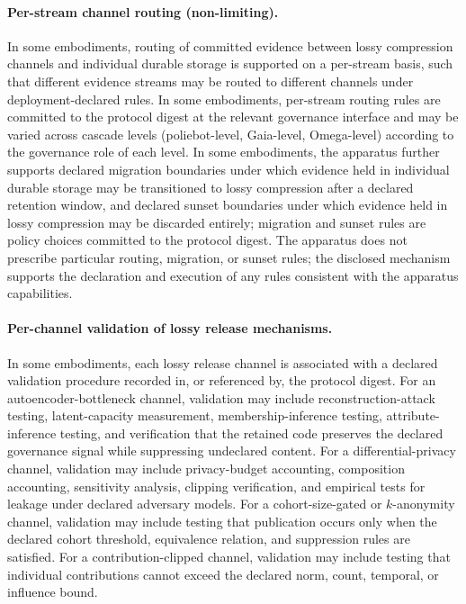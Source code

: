 \documentclass[a4paper,12pt]{article}
\begin{document}
\paragraph{Per-stream channel routing (non-limiting).}
In some embodiments, routing of committed evidence between lossy
compression channels and individual durable storage is supported on
a per-stream basis, such that different evidence streams may be
routed to different channels under deployment-declared rules. In
some embodiments, per-stream routing rules are committed to the
protocol digest at the relevant governance interface and may be
varied across cascade levels (poliebot-level, Gaia-level, Omega-level)
according to the governance role of each level. In some embodiments,
the apparatus further supports declared migration boundaries under
which evidence held in individual durable storage may be transitioned
to lossy compression after a declared retention window, and declared
sunset boundaries under which evidence held in lossy compression
may be discarded entirely; migration and sunset rules are policy
choices committed to the protocol digest. The apparatus does not
prescribe particular routing, migration, or sunset rules; the
disclosed mechanism supports the declaration and execution of any
rules consistent with the apparatus capabilities.

\paragraph{Per-channel validation of lossy release mechanisms.}
In some embodiments, each lossy release channel is associated with a
declared validation procedure recorded in, or referenced by, the
protocol digest. For an autoencoder-bottleneck channel, validation may
include reconstruction-attack testing, latent-capacity measurement,
membership-inference testing, attribute-inference testing, and
verification that the retained code preserves the declared governance
signal while suppressing undeclared content. For a
differential-privacy channel, validation may include privacy-budget
accounting, composition accounting, sensitivity analysis, clipping
verification, and empirical tests for leakage under declared
adversary models. For a cohort-size-gated or $k$-anonymity channel,
validation may include testing that publication occurs only when the
declared cohort threshold, equivalence relation, and suppression rules
are satisfied. For a contribution-clipped channel, validation may
include testing that individual contributions cannot exceed the
declared norm, count, temporal, or influence bound.
\end{document}
